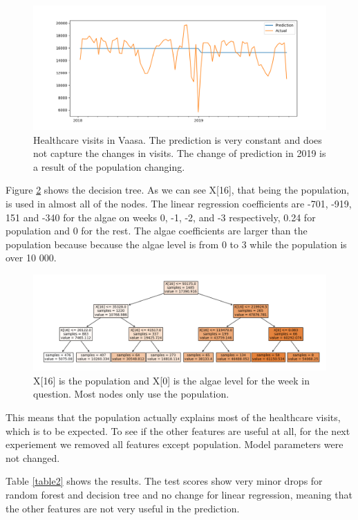 \documentclass[a4paper, 12pt, english]{article}
\begin{document}
\begin{figure}[h]
\includegraphics[width=\textwidth]{predictions1}
\caption{
Healthcare visits in Vaasa. The prediction is very
constant and does not capture the changes in
visits. The change of prediction in
2019 is a result of the population changing.
}
\label{predictions1}
\end{figure}

Figure \ref{tree1} shows the decision tree. As we can see
X[16], that being the population, is used in almost
all of the nodes. The linear regression coefficients
are -701, -919,  151 and -340 for the algae on weeks
0, -1, -2, and -3 respectively, 0.24 for population
and 0 for the rest. The algae coefficients are larger
than the population because because the algae level is from 0 to 3
while the population is over 10 000.

\begin{figure}[h]
\includegraphics[width=\textwidth]{tree1}
\caption{
X[16] is the population and X[0] is the algae level for the week in question.
Most nodes only use the population.
}
\label{tree1}
\end{figure}

This means that the population actually
explains most of the healthcare visits, which is
to be expected. To see if the other features are useful at all,
for the next experiement we removed all features
except population. Model parameters were not changed.

Table \ref{table2} shows the results.
The test scores show very minor drops for random forest
and decision tree and no change for linear regression,
meaning that the other features are not very useful
in the prediction.
\end{document}
